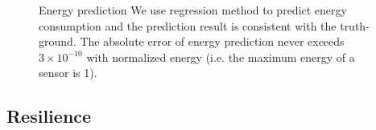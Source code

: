 \begin{figure}[htbp]
	\centering
	\hspace{-0.3cm}
	\hspace{-0.2cm}
	\vspace{-0.1in}
	\caption{Energy prediction
		\textnormal{
			We use regression method to predict energy consumption and the
			prediction result is consistent with the truth-ground.  The absolute
			error of energy prediction never exceeds $3\times10^{-10}$ with normalized energy
			(i.e. the maximum energy of a sensor is 1).
		}
	}
	\label{fig:energy_pred}
\end{figure}

\subsection{Resilience}


